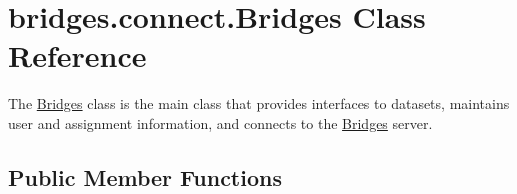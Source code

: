 \hypertarget{classbridges_1_1connect_1_1_bridges}{}\section{bridges.\+connect.\+Bridges Class Reference}
\label{classbridges_1_1connect_1_1_bridges}


The \hyperlink{classbridges_1_1connect_1_1_bridges}{Bridges} class is the main class that provides interfaces to datasets, maintains user and assignment information, and connects to the \hyperlink{classbridges_1_1connect_1_1_bridges}{Bridges} server.  


\subsection*{Public Member Functions}

